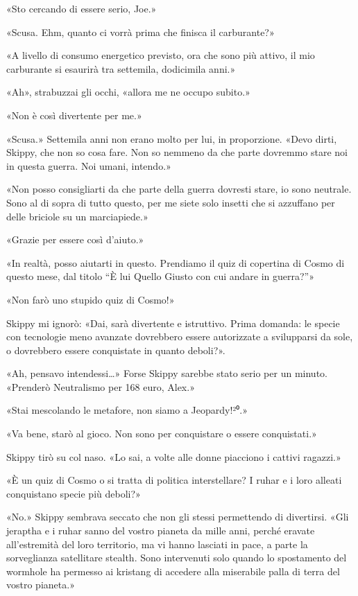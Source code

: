 «Sto cercando di essere serio, Joe.»

«Scusa. Ehm, quanto ci vorrà prima che finisca il carburante?»

«A livello di consumo energetico previsto, ora che sono più attivo, il
mio carburante si esaurirà tra settemila, dodicimila anni.»

«Ah», strabuzzai gli occhi, «allora me ne occupo subito.»

«Non è così divertente per me.»

«Scusa.» Settemila anni non erano molto per lui, in proporzione. «Devo
dirti, Skippy, che non so cosa fare. Non so nemmeno da che parte
dovremmo stare noi in questa guerra. Noi umani, intendo.»

«Non posso consigliarti da che parte della guerra dovresti stare, io
sono neutrale. Sono al di sopra di tutto questo, per me siete solo
insetti che si azzuffano per delle briciole su un marciapiede.»

«Grazie per essere così d'aiuto.»

«In realtà, posso aiutarti in questo. Prendiamo il quiz di copertina di
Cosmo di questo mese, dal titolo ``È lui Quello Giusto con cui andare in
guerra?''»

«Non farò uno stupido quiz di Cosmo!»

Skippy mi ignorò: «Dai, sarà divertente e istruttivo. Prima domanda: le
specie con tecnologie meno avanzate dovrebbero essere autorizzate a
svilupparsi da sole, o dovrebbero essere conquistate in quanto deboli?».

«Ah, pensavo intendessi\ldots» Forse Skippy sarebbe stato serio per un
minuto. «Prenderò Neutralismo per 168 euro, Alex.»

«Stai mescolando le metafore, non siamo a Jeopardy!²⁰.»

«Va bene, starò al gioco. Non sono per conquistare o essere
conquistati.»

Skippy tirò su col naso. «Lo sai, a volte alle donne piacciono i cattivi
ragazzi.»

«È un quiz di Cosmo o si tratta di politica interstellare? I ruhar e i
loro alleati conquistano specie più deboli?»

«No.» Skippy sembrava seccato che non gli stessi permettendo di
divertirsi. «Gli jeraptha e i ruhar sanno del vostro pianeta da mille
anni, perché eravate all'estremità del loro territorio, ma vi hanno
lasciati in pace, a parte la sorveglianza satellitare stealth. Sono
intervenuti solo quando lo spostamento del wormhole ha permesso ai
kristang di accedere alla miserabile palla di terra del vostro pianeta.»

